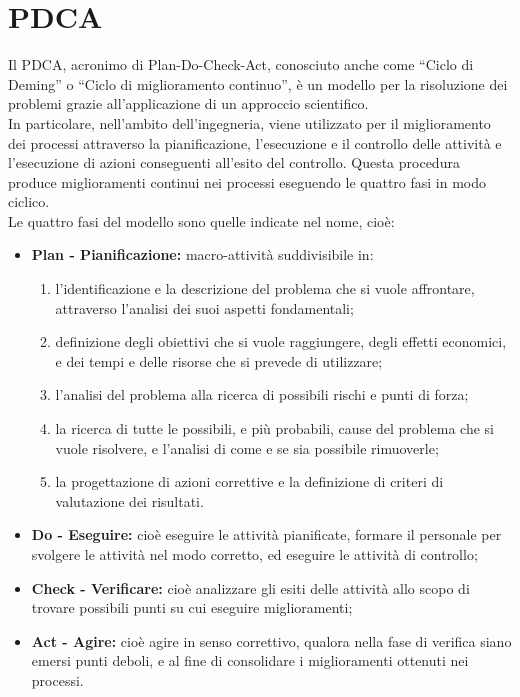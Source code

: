 
\section{PDCA} \label{app:pdca}
Il PDCA, acronimo di Plan-Do-Check-Act, conosciuto anche come ``Ciclo di Deming'' o ``Ciclo di miglioramento continuo'', è un modello per la risoluzione dei problemi grazie all'applicazione di un approccio scientifico.\\
In particolare, nell'ambito dell'ingegneria, viene utilizzato per il miglioramento dei processi attraverso la pianificazione, l'esecuzione e il controllo delle attività e l'esecuzione di azioni conseguenti all'esito del controllo. Questa procedura produce miglioramenti continui nei processi eseguendo le quattro fasi in modo ciclico.\\
Le quattro fasi del modello sono quelle indicate nel nome, cioè:
\begin{itemize}
	\item \textbf{Plan - Pianificazione:} macro-attività suddivisibile in:
		\begin{enumerate}
		\item l'identificazione e la descrizione del problema che si vuole affrontare, attraverso l'analisi dei suoi aspetti fondamentali;
		\item definizione degli obiettivi che si vuole raggiungere, degli effetti economici, e dei tempi e delle risorse che si prevede di utilizzare;
		\item l'analisi del problema alla ricerca di possibili rischi e punti di forza;
		\item la ricerca di tutte le possibili, e più probabili, cause del problema che si vuole risolvere, e l'analisi di come e se sia possibile rimuoverle;
		\item la progettazione di azioni correttive e la definizione di criteri di valutazione dei risultati.
		\end{enumerate}
	\item \textbf{Do - Eseguire:} cioè eseguire le attività pianificate, formare il personale per svolgere le attività nel modo corretto, ed eseguire le attività di controllo;
	\item \textbf{Check - Verificare:} cioè analizzare gli esiti delle attività allo scopo di trovare possibili punti su cui eseguire miglioramenti;
	\item \textbf{Act - Agire:} cioè agire in senso correttivo, qualora nella fase di verifica siano emersi punti deboli, e al fine di consolidare i miglioramenti ottenuti nei processi.
\end{itemize}

